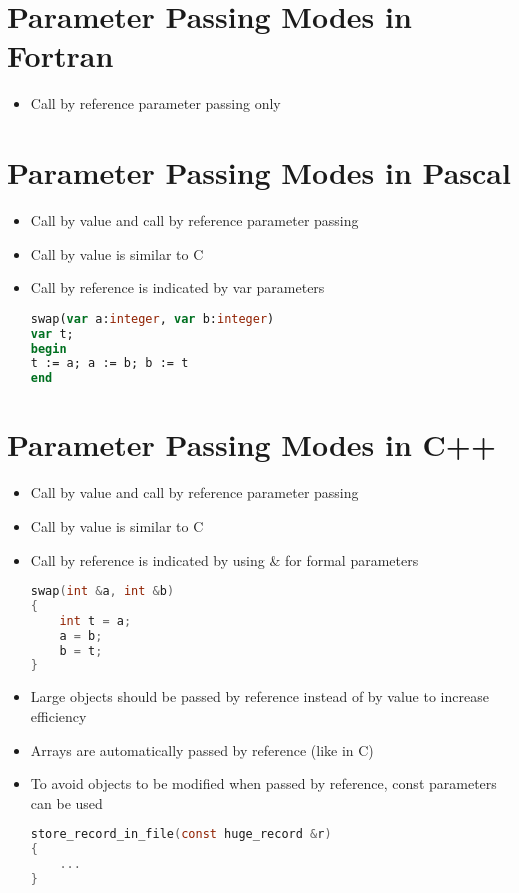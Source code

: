 \documentclass[12pt]{article}
\begin{document}
\section{Parameter Passing Modes in Fortran}

\begin{itemize}
	\item Call by reference parameter passing only
\end{itemize}


\section{Parameter Passing Modes in Pascal}

\begin{itemize}
	\item Call by value and call by reference parameter passing
	\item Call by value is similar to C
	\item Call by reference is indicated by var parameters
\begin{lstlisting}[language=Pascal]
swap(var a:integer, var b:integer)
var t;
begin
t := a; a := b; b := t
end
\end{lstlisting}
\end{itemize}


\newpage

\section{Parameter Passing Modes in C++}

\begin{itemize}
	\item Call by value and call by reference parameter passing
	\item Call by value is similar to C
	\item Call by reference is indicated by using \& for formal parameters
\begin{lstlisting}[language=C]
swap(int &a, int &b)
{ 
	int t = a; 
	a = b; 
	b = t; 
}
\end{lstlisting}

	\item Large objects should be passed by reference instead of by value to increase efficiency
	\item Arrays are automatically passed by reference (like in C)
	\item To avoid objects to be modified when passed by reference, const parameters can be used
\begin{lstlisting}[language=C]
store_record_in_file(const huge_record &r)
{ 
	... 
}
\end{lstlisting}

\end{itemize}
\end{document}
